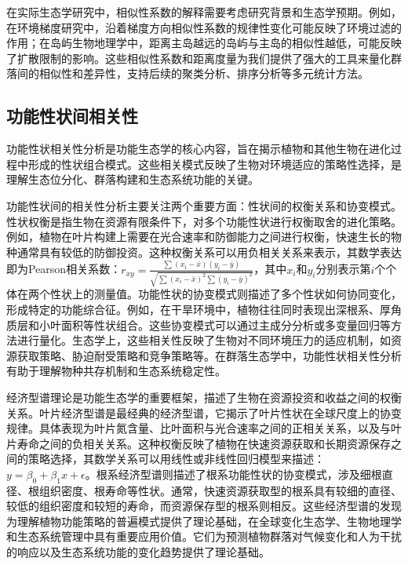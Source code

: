 \documentclass[
  twoside,12pt,fontset=none]{ctexbook}
\begin{document}
在实际生态学研究中，相似性系数的解释需要考虑研究背景和生态学预期。例如，在环境梯度研究中，沿着梯度方向相似性系数的规律性变化可能反映了环境过滤的作用；在岛屿生物地理学中，距离主岛越远的岛屿与主岛的相似性越低，可能反映了扩散限制的影响。这些相似性系数和距离度量为我们提供了强大的工具来量化群落间的相似性和差异性，支持后续的聚类分析、排序分析等多元统计方法。

\hypertarget{ux529fux80fdux6027ux72b6ux95f4ux76f8ux5173ux6027}{%
\subsection{功能性状间相关性}\label{ux529fux80fdux6027ux72b6ux95f4ux76f8ux5173ux6027}}

功能性状相关性分析是功能生态学的核心内容，旨在揭示植物和其他生物在进化过程中形成的性状组合模式。这些相关模式反映了生物对环境适应的策略性选择，是理解生态位分化、群落构建和生态系统功能的关键。

功能性状间的相关性分析主要关注两个重要方面：性状间的权衡关系和协变模式。性状权衡是指生物在资源有限条件下，对多个功能性状进行权衡取舍的进化策略。例如，植物在叶片构建上需要在光合速率和防御能力之间进行权衡，快速生长的物种通常具有较低的防御投资。这种权衡关系可以用负相关关系来表示，其数学表达即为Pearson相关系数：\(r_{xy} = \frac{\sum (x_i - \bar{x})(y_i - \bar{y})}{\sqrt{\sum (x_i - \bar{x})^2 \sum (y_i - \bar{y})^2}}\)，其中\(x_i\)和\(y_i\)分别表示第\(i\)个个体在两个性状上的测量值。功能性状的协变模式则描述了多个性状如何协同变化，形成特定的功能综合征。例如，在干旱环境中，植物往往同时表现出深根系、厚角质层和小叶面积等性状组合。这些协变模式可以通过主成分分析或多变量回归等方法进行量化。生态学上，这些相关性反映了生物对不同环境压力的适应机制，如资源获取策略、胁迫耐受策略和竞争策略等。在群落生态学中，功能性状相关性分析有助于理解物种共存机制和生态系统稳定性。

经济型谱理论是功能生态学的重要框架，描述了生物在资源投资和收益之间的权衡关系。叶片经济型谱是最经典的经济型谱，它揭示了叶片性状在全球尺度上的协变规律。具体表现为叶片氮含量、比叶面积与光合速率之间的正相关关系，以及与叶片寿命之间的负相关关系。这种权衡反映了植物在快速资源获取和长期资源保存之间的策略选择，其数学关系可以用线性或非线性回归模型来描述：\(y = \beta_0 + \beta_1x + \epsilon\)。根系经济型谱则描述了根系功能性状的协变模式，涉及细根直径、根组织密度、根寿命等性状。通常，快速资源获取型的根系具有较细的直径、较低的组织密度和较短的寿命，而资源保存型的根系则相反。这些经济型谱的发现为理解植物功能策略的普遍模式提供了理论基础，在全球变化生态学、生物地理学和生态系统管理中具有重要应用价值。它们为预测植物群落对气候变化和人为干扰的响应以及生态系统功能的变化趋势提供了理论基础。
\end{document}
